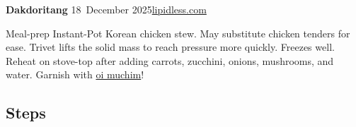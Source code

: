 \documentclass[
    fontsize=11pt,
    letterpaper,oneside,paper=portrait
]{scrartcl}
\newcommand{\myname}{lipidless.com}
\newcommand{\mydate}{18~December 2025}
\newcommand{\mytitle}{Dakdoritang}
\newcommand{\myurl}{https://www.lipidless.com/recipes/dakdoritang}
\newlength{\recipeamountwidth}
\newlength{\recipeunitwidth}
\newlength{\recipedescnaturalwidth}
\newlength{\recipecolumngap}
\newlength{\recipeamountunitgap}
\newlength{\recipeunitdescgap}
\newlength{\recipewidthbuffer}
\newcommand{\measuremaxwidth}[2]{

  \settowidth{\dimen0}{#2}%
  \ifdim\dimen0>#1\relax
    #1=\dimen0\relax
  \fi
}
\begin{document}
{\sffamily \textbf{\LARGE \mytitle} \hfill \mydate \hfill \href{\myurl}{\myname}}

\vspace{\baselineskip}

Meal-prep Instant-Pot Korean chicken stew. May substitute chicken tenders for ease. Trivet lifts the solid mass to reach pressure more quickly. Freezes well. Reheat on stove-top after adding carrots, zucchini, onions, mushrooms, and water. Garnish with \href{https://www.lipidless.com/recipes/oi-muchim}{oi muchim}!

\subsection*{Steps}

\renewcommand{\arraystretch}{1.15}
\setlength{\recipecolumngap}{1.0em}
\setlength{\recipeamountunitgap}{0.3em}
\setlength{\recipeunitdescgap}{0.8em}
\setlength{\recipewidthbuffer}{0.35em}
\setlength{\recipeamountwidth}{2em}
\setlength{\recipeunitwidth}{0pt}
\setlength{\recipedescnaturalwidth}{0pt}
\measuremaxwidth{\recipeamountwidth}{1}
\measuremaxwidth{\recipeunitwidth}{\mbox{}}
\measuremaxwidth{\recipedescnaturalwidth}{whole chicken}
\measuremaxwidth{\recipeamountwidth}{12}
\measuremaxwidth{\recipeunitwidth}{\mbox{}}
\measuremaxwidth{\recipedescnaturalwidth}{garlic cloves, grated}
\measuremaxwidth{\recipeamountwidth}{2}
\measuremaxwidth{\recipeunitwidth}{in}
\measuremaxwidth{\recipedescnaturalwidth}{ginger, grated}
\measuremaxwidth{\recipeamountwidth}{1}
\measuremaxwidth{\recipeunitwidth}{c}
\measuremaxwidth{\recipedescnaturalwidth}{gochujang}
\measuremaxwidth{\recipeamountwidth}{1/4}
\measuremaxwidth{\recipeunitwidth}{c}
\measuremaxwidth{\recipedescnaturalwidth}{coarse gochugaru}
\measuremaxwidth{\recipeamountwidth}{1/4}
\measuremaxwidth{\recipeunitwidth}{c}
\measuremaxwidth{\recipedescnaturalwidth}{fine gochugaru}
\measuremaxwidth{\recipeamountwidth}{1}
\measuremaxwidth{\recipeunitwidth}{c}
\measuremaxwidth{\recipedescnaturalwidth}{soy sauce}
\measuremaxwidth{\recipeamountwidth}{1/3}
\measuremaxwidth{\recipeunitwidth}{c}
\measuremaxwidth{\recipedescnaturalwidth}{mirin}
\measuremaxwidth{\recipeamountwidth}{6}
\measuremaxwidth{\recipeunitwidth}{T}
\measuremaxwidth{\recipedescnaturalwidth}{honey}
\measuremaxwidth{\recipeamountwidth}{2}
\measuremaxwidth{\recipeunitwidth}{t}
\measuremaxwidth{\recipedescnaturalwidth}{black pepper}
\measuremaxwidth{\recipeamountwidth}{3}
\measuremaxwidth{\recipeunitwidth}{\mbox{}}
\measuremaxwidth{\recipedescnaturalwidth}{chopped yellow onions}
\end{document}
